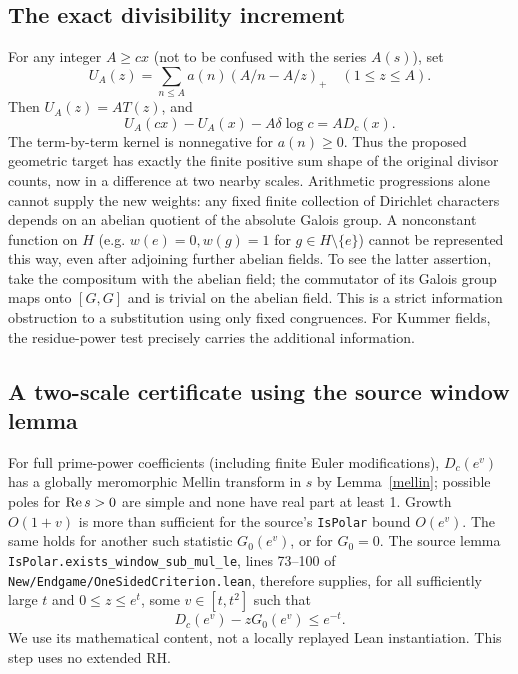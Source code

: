 \documentclass[11pt]{article}
\theoremstyle{definition}\newtheorem{definition}[theorem]{Definition}
\begin{document}
\subsection{The exact divisibility increment}
For any integer $A\ge cx$ (not to be confused with the series $A(s)$), set
\[
 U_A(z)=\sum_{n\le A} a(n)(A/n-A/z)_+\quad(1\le z\le A).
\]
Then $U_A(z)=A T(z)$, and
\begin{equation}
 U_A(cx)-U_A(x)-A\delta\log c=A D_c(x).\label{increment}
\end{equation}
The term-by-term kernel is nonnegative for $a(n)\ge0$. Thus the proposed geometric target has exactly the finite positive sum shape of the original divisor counts, now in a difference at two nearby scales. Arithmetic progressions alone cannot supply the new weights: any fixed finite collection of Dirichlet characters depends on an abelian quotient of the absolute Galois group. A nonconstant function on $H$ (e.g. $w(e)=0,w(g)=1$ for $g\in H\setminus\{e\}$) cannot be represented this way, even after adjoining further abelian fields. To see the latter assertion, take the compositum with the abelian field; the commutator of its Galois group maps onto $[G,G]$ and is trivial on the abelian field. This is a strict information obstruction to a substitution using only fixed congruences. For Kummer fields, the residue-power test precisely carries the additional information.

\subsection{A two-scale certificate using the source window lemma}
For full prime-power coefficients (including finite Euler modifications), $D_c(e^v)$ has a globally meromorphic Mellin transform in $s$ by Lemma~\ref{mellin}; possible poles for $\operatorname{Re} s>0$ are simple and none have real part at least 1. Growth $O(1+v)$ is more than sufficient for the source's \texttt{IsPolar} bound $O(e^v)$. The same holds for another such statistic $G_0(e^v)$, or for $G_0=0$. The source lemma \texttt{IsPolar.exists\_window\_sub\_mul\_le}, lines 73--100 of \texttt{New/Endgame/OneSidedCriterion.lean}, therefore supplies, for all sufficiently large $t$ and $0\le z\le e^t$, some $v\in[t,t^2]$ such that
\[
 D_c(e^v)-zG_0(e^v)\le e^{-t}.
\]
We use its mathematical content, not a locally replayed Lean instantiation. This step uses no extended RH.
\end{document}

